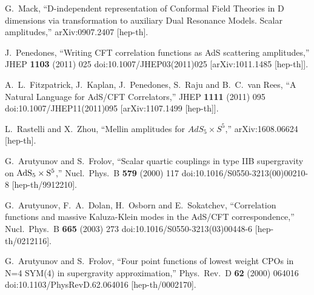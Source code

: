 \documentclass[12pt,a4paper]{article}
\numberwithin{equation}{section}
\begin{document}
\begin{thebibliography}{}

  G.~Mack,
  ``D-independent representation of Conformal Field Theories in D dimensions via transformation to auxiliary Dual Resonance Models. Scalar amplitudes,''
  arXiv:0907.2407 [hep-th].
  
  J.~Penedones,
  ``Writing CFT correlation functions as AdS scattering amplitudes,''
  JHEP {\bf 1103} (2011) 025
  doi:10.1007/JHEP03(2011)025
  [arXiv:1011.1485 [hep-th]].
  
  A.~L.~Fitzpatrick, J.~Kaplan, J.~Penedones, S.~Raju and B.~C.~van Rees,
  ``A Natural Language for AdS/CFT Correlators,''
  JHEP {\bf 1111} (2011) 095
  doi:10.1007/JHEP11(2011)095
  [arXiv:1107.1499 [hep-th]].
  
  L.~Rastelli and X.~Zhou,
  ``Mellin amplitudes for $AdS_5\times S^5$,''
  arXiv:1608.06624 [hep-th].
  

  
  G.~Arutyunov and S.~Frolov,
  ``Scalar quartic couplings in type IIB supergravity on ${\rm AdS}_5\times {\rm S}^5$,''
  Nucl.\ Phys.\ B {\bf 579} (2000) 117
  doi:10.1016/S0550-3213(00)00210-8
  [hep-th/9912210].
  
  G.~Arutyunov, F.~A.~Dolan, H.~Osborn and E.~Sokatchev,
  ``Correlation functions and massive Kaluza-Klein modes in the AdS/CFT correspondence,''
  Nucl.\ Phys.\ B {\bf 665} (2003) 273
  doi:10.1016/S0550-3213(03)00448-6
  [hep-th/0212116].

  

  G.~Arutyunov and S.~Frolov,
  ``Four point functions of lowest weight CPOs in N=4 SYM(4) in supergravity approximation,''
  Phys.\ Rev.\ D {\bf 62} (2000) 064016
  doi:10.1103/PhysRevD.62.064016
  [hep-th/0002170].
  

\end{thebibliography}
\end{document}
